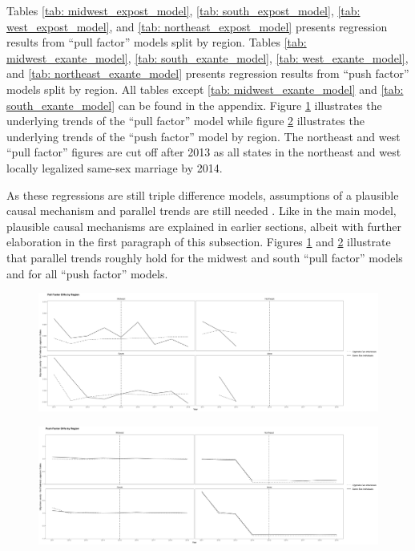 \documentclass[12pt,letterpaper]{article}
\begin{document}


Tables \ref{tab: midwest_expost_model}, \ref{tab: south_expost_model}, \ref{tab: west_expost_model}, and \ref{tab: northeast_expost_model} presents regression results from “pull factor” models split by region. Tables \ref{tab: midwest_exante_model}, \ref{tab: south_exante_model}, \ref{tab: west_exante_model}, and \ref{tab: northeast_exante_model}  presents regression results from “push factor” models split by region. All tables except \ref{tab: midwest_exante_model} and \ref{tab: south_exante_model} can be found in the appendix. Figure \ref{fig: region_post_diffs} illustrates the underlying trends of the “pull factor” model while figure \ref{fig: region_ante_diffs} illustrates the underlying trends of the “push factor” model by region. The northeast and west “pull factor” figures are cut off after 2013 as all states in the northeast and west locally legalized same-sex marriage by 2014.

As these regressions are still triple difference models, assumptions of a plausible causal mechanism and parallel trends are still needed \citep{24, 25}. Like in the main model, plausible causal mechanisms are explained in earlier sections, albeit with further elaboration in the first paragraph of this subsection. Figures \ref{fig: region_post_diffs} and \ref{fig: region_ante_diffs} illustrate that parallel trends roughly hold for the midwest and south “pull factor” models and for all “push factor” models. 

\begin{figure}[htbp]
    \centering
    \includegraphics[width=1\linewidth]{outputs/summary_stats/region_post_diffs.png}
    \caption{}
    \label{fig: region_post_diffs}
\end{figure}

\begin{figure}[htbp]
    \centering
    \includegraphics[width=1\linewidth]{outputs/summary_stats/region_ante_diffs.png}
    \caption{}
    \label{fig: region_ante_diffs}
\end{figure}
\end{document}
